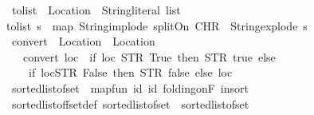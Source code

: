 \begin{isabellebody}
\isanewline
{}\isamarkupfalse%
\ tolist\ {\isacharcolon}{\kern0pt}{\isacharcolon}{\kern0pt}\ {\isachardoublequoteopen}Location\ {\isasymRightarrow}\ String{\isachardot}{\kern0pt}literal\ list{\isachardoublequoteclose}\ \ \isanewline
{\isachardoublequoteopen}tolist\ s\ {\isacharequal}{\kern0pt}\ map\ String{\isachardot}{\kern0pt}implode\ {\isacharparenleft}{\kern0pt}splitOn\ {\isacharparenleft}{\kern0pt}CHR\ {\isacharprime}{\kern0pt}{\isacharprime}{\kern0pt}{\isachardot}{\kern0pt}{\isacharprime}{\kern0pt}{\isacharprime}{\kern0pt}{\isacharparenright}{\kern0pt}\ {\isacharparenleft}{\kern0pt}String{\isachardot}{\kern0pt}explode\ s{\isacharparenright}{\kern0pt}{\isacharparenright}{\kern0pt}{\isachardoublequoteclose}\isanewline
\isanewline
{}\isamarkupfalse%
\ convert\ {\isacharcolon}{\kern0pt}{\isacharcolon}{\kern0pt}\ {\isachardoublequoteopen}Location\ {\isasymRightarrow}\ Location{\isachardoublequoteclose}\isanewline
\ \ \ {\isachardoublequoteopen}convert\ loc\ {\isasymequiv}\ {\isacharparenleft}{\kern0pt}if\ loc{\isacharequal}{\kern0pt}\ STR\ {\isacharprime}{\kern0pt}{\isacharprime}{\kern0pt}True{\isacharprime}{\kern0pt}{\isacharprime}{\kern0pt}\ then\ STR\ {\isacharprime}{\kern0pt}{\isacharprime}{\kern0pt}true{\isacharprime}{\kern0pt}{\isacharprime}{\kern0pt}\ else\isanewline
\ \ \ \ if\ loc{\isacharequal}{\kern0pt}STR\ {\isacharprime}{\kern0pt}{\isacharprime}{\kern0pt}False{\isacharprime}{\kern0pt}{\isacharprime}{\kern0pt}\ then\ STR\ {\isacharprime}{\kern0pt}{\isacharprime}{\kern0pt}false{\isacharprime}{\kern0pt}{\isacharprime}{\kern0pt}\ else\ loc{\isacharparenright}{\kern0pt}{\isachardoublequoteclose}\isanewline
\isanewline
{}\isamarkupfalse%
\ {\isacartoucheopen}sorted{\isacharunderscore}{\kern0pt}list{\isacharunderscore}{\kern0pt}of{\isacharunderscore}{\kern0pt}set{\isacharprime}{\kern0pt}\ {\isasymequiv}\ map{\isacharunderscore}{\kern0pt}fun\ id\ id\ {\isacharparenleft}{\kern0pt}folding{\isacharunderscore}{\kern0pt}on{\isachardot}{\kern0pt}F\ insort\ {\isacharbrackleft}{\kern0pt}{\isacharbrackright}{\kern0pt}{\isacharparenright}{\kern0pt}{\isacartoucheclose}\isanewline
\isanewline
{}\isamarkupfalse%
\ sorted{\isacharunderscore}{\kern0pt}list{\isacharunderscore}{\kern0pt}of{\isacharunderscore}{\kern0pt}fset{\isacharprime}{\kern0pt}{\isacharunderscore}{\kern0pt}def{\isacharprime}{\kern0pt}{\isacharcolon}{\kern0pt}\ {\isacartoucheopen}sorted{\isacharunderscore}{\kern0pt}list{\isacharunderscore}{\kern0pt}of{\isacharunderscore}{\kern0pt}set{\isacharprime}{\kern0pt}\ {\isacharequal}{\kern0pt}\ sorted{\isacharunderscore}{\kern0pt}list{\isacharunderscore}{\kern0pt}of{\isacharunderscore}{\kern0pt}set{\isacartoucheclose}\isanewline

\end{isabellebody}
